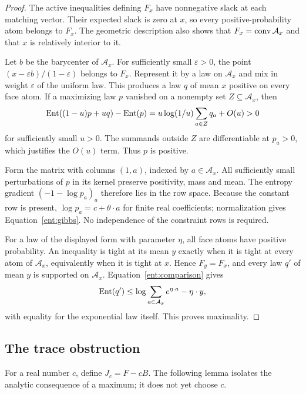\begin{proof}
The active inequalities defining $F_x$ have nonnegative slack at each
matching vector. Their expected slack is zero at $x$, so every
positive-probability atom belongs to $F_x$. The geometric description also
shows that $F_x=\operatorname{conv}\mathcal A_x$ and that $x$ is relatively interior to it.

Let $b$ be the barycenter of $\mathcal A_x$. For sufficiently small
$\varepsilon>0$, the point $(x-\varepsilon b)/(1-\varepsilon)$ belongs
to $F_x$. Represent it by a law on $\mathcal A_x$ and mix in weight
$\varepsilon$ of the uniform law. This produces a law $q$ of mean $x$
positive on every face atom. If a maximizing law $p$ vanished on a
nonempty set $Z\subseteq\mathcal A_x$, then
\[
 \operatorname{Ent}((1-u)p+uq)-\operatorname{Ent}(p)
 =u\log(1/u)\sum_{a\in Z}q_a+O(u)>0
\]
for sufficiently small $u>0$. The summands outside $Z$ are differentiable
at $p_a>0$, which justifies the $O(u)$ term. Thus $p$ is positive.

Form the matrix with columns $(1,a)$, indexed by $a\in\mathcal A_x$.
All sufficiently small perturbations of $p$ in its kernel preserve
positivity, mass and mean. The entropy gradient $(-1-\log p_a)_a$
therefore lies in the row space. Because the constant row is present,
$\log p_a=c+\theta\cdot a$ for finite real coefficients; normalization
gives Equation~\eqref{ent:gibbs}. No independence of the constraint rows
is required.

For a law of the displayed form with parameter $\eta$, all face atoms
have positive probability. An inequality is tight at its mean $y$
exactly when it is tight at every atom of $\mathcal A_x$, equivalently
when it is tight at $x$. Hence $F_y=F_x$, and every law $q'$ of mean $y$
is supported on $\mathcal A_x$. Equation~\eqref{ent:comparison} gives
\[
 \operatorname{Ent}(q')\le\log\sum_{a\in\mathcal A_x}e^{\eta\cdot a}-\eta\cdot y,
\]
with equality for the exponential law itself. This proves maximality.
\end{proof}

\subsection{The trace obstruction}

For a real number $c$, define $J_c=F-cB$. The following lemma isolates
the analytic consequence of a maximum; it does not yet choose $c$.

